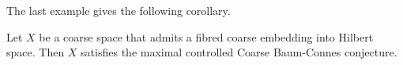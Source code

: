 The last example gives the following corollary.

\begin{cor}\label{fibred}
Let $X$ be a coarse space that admits a fibred coarse embedding into Hilbert space. Then $X$ satisfies the maximal controlled Coarse Baum-Connes conjecture. %
\end{cor}
%
